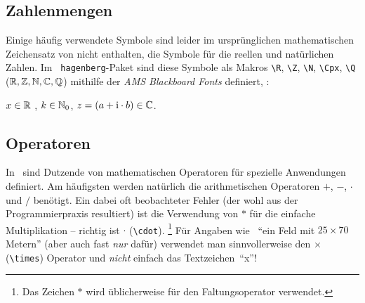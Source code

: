 \subsection{Zahlenmengen}
Einige häufig verwendete Symbole sind leider im ursprünglichen
mathematischen Zeichensatz von \latex nicht enthalten, \zB die
Symbole für die reellen und natürlichen Zahlen. Im {\tt
hagenberg}-Paket sind diese Symbole als Makros 
\verb!\R!, \verb!\Z!, \verb!\N!, \verb!\Cpx!, \verb!\Q!
($\mathbb{R}, \mathbb{Z}, \mathbb{N}, \mathbb{C}, \mathbb{Q}$)
mithilfe der \emph{AMS Blackboard Fonts} definiert, \zB:
\begin{center}
$x \in \mathbb{R}$ , $k \in \mathbb{N}_0$, $z = (a + \mathrm{i} \cdot b) \in \mathbb{C}$.
\end{center}


\subsection{Operatoren}

In \latex\ sind Dutzende von mathematischen Operatoren für spezielle Anwendungen definiert. Am häufigsten werden natürlich die arithmetischen Operatoren $+$, $-$, $\cdot$ und $/$ benötigt. Ein dabei oft beobachteter Fehler (der wohl aus der Programmierpraxis resultiert) ist die Verwendung von $*$ für die einfache Multiplikation -- richtig ist $\cdot$ (\verb!\cdot!).%
\footnote{Das Zeichen $*$ wird üblicherweise für den Faltungsoperator verwendet.}
%
Für Angaben wie \zB\ "`ein Feld mit $25 \times 70$ Metern"' (aber auch fast \emph{nur} dafür) verwendet man sinnvollerweise den $\times$ (\verb!\times!) Operator und \emph{nicht} einfach das Textzeichen~"`x"'!


